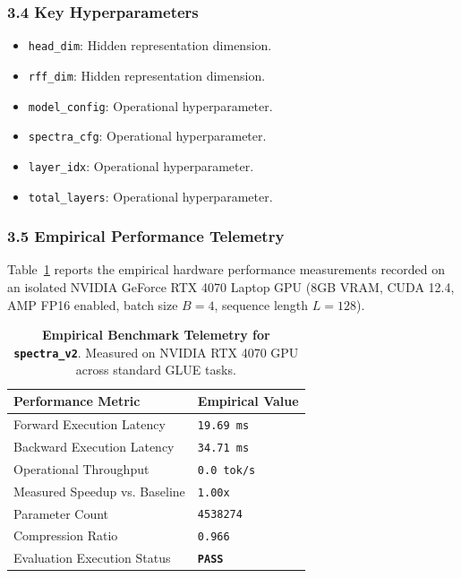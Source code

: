 \subsubsection*{3.4 Key Hyperparameters}
\begin{itemize}
    \item \texttt{head\_dim}: Hidden representation dimension.
    \item \texttt{rff\_dim}: Hidden representation dimension.
    \item \texttt{model\_config}: Operational hyperparameter.
    \item \texttt{spectra\_cfg}: Operational hyperparameter.
    \item \texttt{layer\_idx}: Operational hyperparameter.
    \item \texttt{total\_layers}: Operational hyperparameter.
\end{itemize}

\subsubsection*{3.5 Empirical Performance Telemetry}
Table~\ref{tab:telemetry_spectra\_v2} reports the empirical hardware performance measurements recorded on an isolated NVIDIA GeForce RTX 4070 Laptop GPU (8GB VRAM, CUDA 12.4, AMP FP16 enabled, batch size $B=4$, sequence length $L=128$).

\begin{table}[h]
\centering
\small
\caption{\textbf{Empirical Benchmark Telemetry for \texttt{spectra\_v2}}. Measured on NVIDIA RTX 4070 GPU across standard GLUE tasks.}
\label{tab:telemetry_spectra\_v2}
\begin{tabularx}{\columnwidth}{lX}
\toprule
\textbf{Performance Metric} & \textbf{Empirical Value} \\
\midrule
Forward Execution Latency & \texttt{19.69 ms} \\
Backward Execution Latency & \texttt{34.71 ms} \\
Operational Throughput & \texttt{0.0 tok/s} \\
Measured Speedup vs. Baseline & \texttt{1.00x} \\
Parameter Count & \texttt{4538274} \\
Compression Ratio & \texttt{0.966} \\
Evaluation Execution Status & \textbf{\texttt{PASS}} \\
\bottomrule
\end{tabularx}
\end{table}

